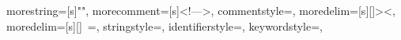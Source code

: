 
{
  morestring=[s]{"}{"},
  morecomment=[s]{<!--}{-->},
  commentstyle=\color{DarkOliveGreen},
  moredelim=[s][\color{black}]{>}{<},
  moredelim=[s][\color{red}]{\ }{=},
  stringstyle=\color{blue},
  identifierstyle=\color{Maroon},
  keywordstyle=\color{red},
}

%



